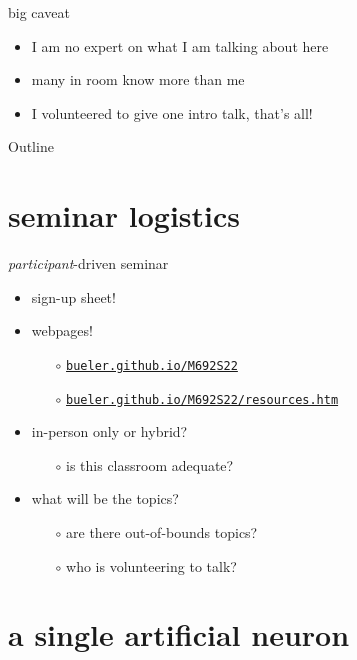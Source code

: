 \documentclass[xcolor={svgnames},
               hyperref={colorlinks,citecolor=DeepPink4,linkcolor=FireBrick,urlcolor=Maroon}]
               {beamer}
\begin{document}
\begin{frame}{big caveat}

\begin{itemize}
\item I am no expert on what I am talking about here
\item many in room know more than me
\item I volunteered to give one intro talk, that's all!
\end{itemize}
\end{frame}

\begin{frame}{Outline}
  \tableofcontents[hideallsubsections]
\end{frame}


\section{seminar logistics}

\begin{frame}{\emph{participant}-driven seminar}

\begin{itemize}
\item sign-up sheet!
\item webpages!
    \begin{itemize}
    \item[$\circ$] \href{http://bueler.github.io/M692S22/index.html}{\texttt{bueler.github.io/M692S22}}
    \item[$\circ$] \href{http://bueler.github.io/M692S22/resources.htm}{\texttt{bueler.github.io/M692S22/resources.htm}}
    \end{itemize}
\item in-person only or hybrid?
    \begin{itemize}
    \item[$\circ$] is this classroom adequate?
    \end{itemize}
\item what will be the topics?
    \begin{itemize}
    \item[$\circ$] are there out-of-bounds topics?
    \item[$\circ$] who is volunteering to talk?
    \end{itemize}
\end{itemize}
\end{frame}


\section{a single artificial neuron}
\end{document}
